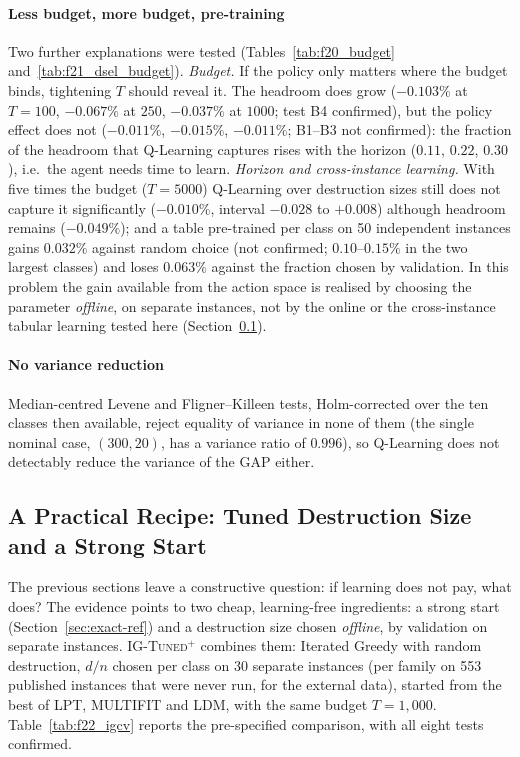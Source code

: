 \documentclass[final,3p,times,11pt,authoryear]{elsarticle}
\begin{document}
\paragraph{Less budget, more budget, pre-training}
Two further explanations were tested (Tables~\ref{tab:f20_budget}
and~\ref{tab:f21_dsel_budget}). \emph{Budget.} If the policy only matters
where the budget binds, tightening $T$ should reveal it. The headroom does
grow ($-0.103\%$ at $T=100$, $-0.067\%$ at $250$, $-0.037\%$ at $1000$; test
B4 confirmed), but the policy effect does not ($-0.011\%$, $-0.015\%$,
$-0.011\%$; B1--B3 not confirmed): the fraction of the headroom that Q-Learning
captures rises with the horizon ($0.11$, $0.22$, $0.30$), i.e.\ the agent needs
time to learn. \emph{Horizon and cross-instance learning.} With five times the
budget ($T=5000$) Q-Learning over destruction sizes still does not capture it
significantly ($-0.010\%$, interval $-0.028$ to $+0.008$) although headroom remains
($-0.049\%$); and a table pre-trained per
class on 50 independent instances gains $0.032\%$ against random choice
(not confirmed; $0.10$--$0.15\%$ in the two largest classes) and loses $0.063\%$
against the fraction chosen by validation. In this problem the gain available
from the action space is realised by choosing the parameter \emph{offline},
on separate instances, not by the online or the cross-instance tabular
learning tested here (Section~\ref{sec:recipe}).




\paragraph{No variance reduction}
Median-centred Levene \citep{BrownForsythe1974} and
Fligner--Killeen \citep{FlignerKilleen1976} tests, Holm-corrected over the
ten classes then available, reject equality of variance in none of them
(the single nominal case, $(300,20)$, has a variance ratio of $0.996$),
so Q-Learning does not detectably reduce the variance of the GAP either.

\subsection{A Practical Recipe: Tuned Destruction Size and a Strong Start}
\label{sec:recipe}

The previous sections leave a constructive question: if learning does not pay,
what does? The evidence points to two cheap, learning-free ingredients: a
strong start (Section~\ref{sec:exact-ref}) and a destruction size chosen
\emph{offline}, by validation on separate instances. \textsc{IG-Tuned}$^{+}$
combines them: Iterated Greedy with random destruction, $d/n$ chosen per
class on 30 separate instances (per family on 553 published instances that
were never run, for the external data), started from the best of LPT,
MULTIFIT and LDM, with the same budget $T=1{,}000$. Table~\ref{tab:f22_igcv}
reports the pre-specified comparison, with all eight tests confirmed.
\end{document}
